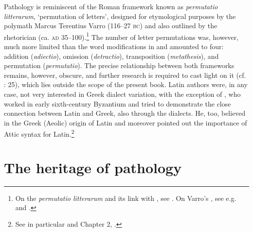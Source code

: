 Pathology is reminiscent of the Roman framework known as \textit{permutatio litterarum}, ‘permutation of letters’, designed for etymological purposes by the polymath Marcus Terentius Varro (116–27 \textsc{bc}) and also outlined by the rhetorician  (ca. \textsc{ad} 35–100).\footnote{{On the} {\textit{permutatio litterarum} }{and its link with , see \citet[esp. 25–28, 37]{Ax1987}. On Varro’s , see e.g. \citet{Pfaffel1981} and \citet[7--10, {\textit{passim}}]{Taylor1996}.}} The number of letter permutations was, however, much more limited than the word modifications in  and amounted to four: addition (\textit{adiectio}), omission (\textit{detractio}), transposition (\textit{metathesis}), and permutation (\textit{permutatio}). The precise relationship between both frameworks remains, however, obscure, and further research is required to cast light on it (cf. \citealt{Ax1987}: 25), which lies outside the scope of the present book. Latin authors were, in any case, not very interested in Greek dialect variation, with the exception of , who worked in early sixth-century Byzantium and tried to demonstrate the close connection between Latin and Greek, also through the dialects. He, too, believed in the Greek (Aeolic) origin of Latin and moreover pointed out the importance of Attic syntax for Latin.\footnote{{See in particular \citet[]{Conduche_latin_nodate} and Chapter 2, .}}


\section{The heritage of pathology}\label{sec:6.2}

